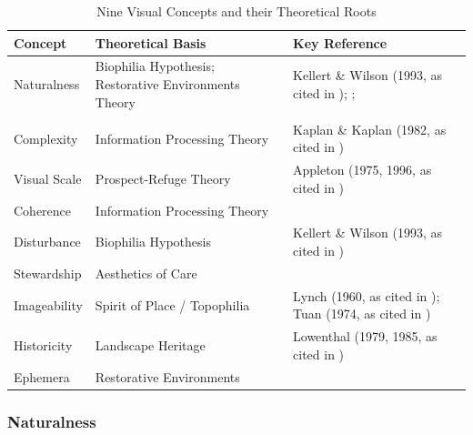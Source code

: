 \documentclass[hidelinks, 11pt]{article}
\begin{document}
\begin{table}[ht]
\centering
\caption{Nine Visual Concepts and their Theoretical Roots \citet{ode_capturing_2008}}
\label{tab:concepts}
\begin{tabular}{lll}
\toprule
\textbf{Concept} & \textbf{Theoretical Basis} & \textbf{Key Reference} \\
\midrule
Naturalness      & Biophilia Hypothesis; Restorative Environments Theory 
                 & Kellert \& Wilson (1993, as cited in \citet{tveit_key_2006}); \citet{kaplan_environmental_1989}; \\
                 & & \citet{ulrich_visual_1979,ulrich_view_1984} \\
\addlinespace
Complexity       & Information Processing Theory 
                 & Kaplan \& Kaplan (1982, as cited in \citet{tveit_key_2006}) \\
\addlinespace
Visual Scale     & Prospect-Refuge Theory 
                 & Appleton (1975, 1996, as cited in \citet{tveit_key_2006}) \\
\addlinespace
Coherence        & Information Processing Theory 
                 & \citet{kaplan_experience_1989} \\
\addlinespace
Disturbance      & Biophilia Hypothesis 
                 & Kellert \& Wilson (1993, as cited in \citet{tveit_key_2006}) \\
\addlinespace
Stewardship      & Aesthetics of Care 
                 & \citet{nassauer_messy_1995,nassauer_placing_2013} \\
\addlinespace
Imageability     & Spirit of Place / Topophilia 
                 & Lynch (1960, as cited in \citet{tveit_key_2006}); Tuan (1974, as cited in \citet{tveit_key_2006}) \\
\addlinespace
Historicity      & Landscape Heritage 
                 & Lowenthal (1979, 1985, as cited in \citet{tveit_key_2006}) \\
\addlinespace
Ephemera         & Restorative Environments 
                 & \citet{kaplan_environmental_1989} \\
\bottomrule
\end{tabular}
\end{table}

\subsubsection{Naturalness}\label{sec:Na}
\end{document}
